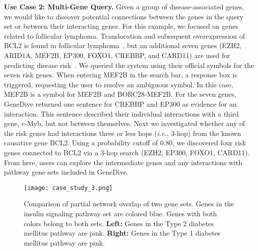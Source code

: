 \documentclass{ws-procs11x85}
\begin{document}
\noindent \textbf{Use Case 2: Multi-Gene Query.}  Given a group of disease-associated genes, we would like to discover potential connections between the genes in the query set or between their interacting genes. For this example, we focused on genes related to follicular lymphoma. Translocation and subsequent overexpression of BCL2 is found in follicular lymphoma~\cite{Kridel2012}, but an additional seven genes (EZH2, ARID1A, MEF2B, EP300, FOXO1, CREBBP, and CARD11) are used for predicting disease risk~\cite{Pastore2015}.  We queried the system using their official symbols for the seven risk genes. When entering MEF2B in the search bar, a response box is triggered, requesting the user to resolve an ambiguous symbol. In this case, MEF2B is a symbol for MEF2B and BORC28-MEF2B. For the seven genes, GeneDive returned one sentence for CREBBP and EP300 as evidence for an interaction. This sentence described their individual interactions with a third gene, c-Myb, but not between themselves. Next we investigated whether any of the risk genes had interactions three or less hops (\textit{i.e.}, 3-hop) from the known causative gene BCL2. Using a probability cutoff of 0.80, we discovered four risk genes connected to BCL2 via a 3-hop search (EZH2, EP300, FOXO1, CARD11). From here, users can explore the intermediate genes and any interactions with pathway gene sets included in GeneDive.

\begin{figure}
\centerline{\texttt{[image: case\_study\_3.png]}}
\caption{Comparison of partial network overlap of two gene sets. Genes in the insulin signaling pathway set are colored blue. Genes with both colors belong to both sets.  \textbf{Left:} Genes in the Type 2 diabetes mellitus pathway are pink. \textbf{Right:} Genes in the Type 1 diabetes mellitus pathway are pink.}
\label{fig:insulinType1v2}
\end{figure}
\end{document}

